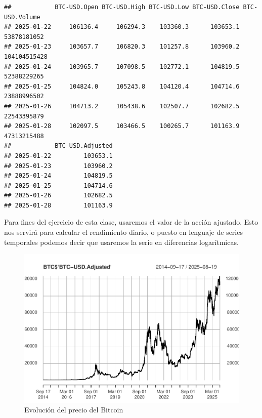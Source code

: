 \documentclass[
]{book}
\newenvironment{Shaded}{\begin{snugshade}}{\end{snugshade}}
\newcommand{\AttributeTok}[1]{\textcolor[rgb]{0.13,0.29,0.53}{#1}}
\newcommand{\FunctionTok}[1]{\textcolor[rgb]{0.13,0.29,0.53}{\textbf{#1}}}
\newcommand{\NormalTok}[1]{#1}
\newcommand{\SpecialCharTok}[1]{\textcolor[rgb]{0.81,0.36,0.00}{\textbf{#1}}}
\newcommand{\StringTok}[1]{\textcolor[rgb]{0.31,0.60,0.02}{#1}}
\begin{document}
\begin{verbatim}
##            BTC-USD.Open BTC-USD.High BTC-USD.Low BTC-USD.Close BTC-USD.Volume
## 2025-01-22     106136.4     106294.3    103360.3      103653.1    53878181052
## 2025-01-23     103657.7     106820.3    101257.8      103960.2   104104515428
## 2025-01-24     103965.7     107098.5    102772.1      104819.5    52388229265
## 2025-01-25     104824.0     105243.8    104120.4      104714.6    23888996502
## 2025-01-26     104713.2     105438.6    102507.7      102682.5    22543395879
## 2025-01-28     102097.5     103466.5    100265.7      101163.9    47313215488
##            BTC-USD.Adjusted
## 2025-01-22         103653.1
## 2025-01-23         103960.2
## 2025-01-24         104819.5
## 2025-01-25         104714.6
## 2025-01-26         102682.5
## 2025-01-28         101163.9
\end{verbatim}

Para fines del ejercicio de esta clase, usaremos el valor de la acción ajustado. Esto nos servirá para calcular el rendimiento diario, o puesto en lenguaje de series temporales podemos decir que usaremos la serie en diferencias logarítmicas.

\begin{Shaded}
\end{Shaded}

\begin{figure}

{\centering \includegraphics{Notas-Series-Tiempo_files/figure-latex/fig101-1} 

}

\caption{Evolución del precio del Bitcoin}\label{fig:fig101}
\end{figure}
\end{document}
